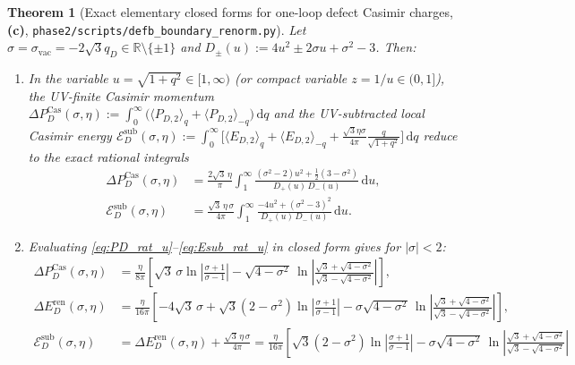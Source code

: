 \documentclass[11pt,a4paper]{article}
\newtheorem{theorem}{Theorem}[section]
\theoremstyle{remark}
\newcommand{\dd}{\mathrm{d}}
\newcommand{\Lc}{\textbf{(c)}}
\newcommand{\sren}{\texttt{phase2/\allowbreak scripts/\allowbreak defb\_\allowbreak boundary\_\allowbreak renorm.py}}
\begin{document}
\begin{theorem}[Exact elementary closed forms for one-loop defect Casimir charges, \Lc, \sren]\label{thm:casimir_closed}
Let $\sigma = \sigma_{\mathrm{vac}} = -2\sqrt{3}q_D \in \mathbb{R}\setminus\{\pm 1\}$
and $D_\pm(u) := 4u^2 \pm 2\sigma u + \sigma^2 - 3$. Then:
\begin{enumerate}
\item In the variable $u = \sqrt{1+q^2} \in [1,\infty)$ (or compact variable
$z = 1/u \in (0,1]$), the UV-finite Casimir momentum
$\Delta P_D^{\mathrm{Cas}}(\sigma,\eta) := \int_0^\infty \big(\langle P_{D,2}\rangle_q + \langle P_{D,2}\rangle_{-q}\big)\,\dd q$
and the UV-subtracted local Casimir energy
$\mathcal{E}_D^{\mathrm{sub}}(\sigma,\eta) := \int_0^\infty \big[\langle E_{D,2}\rangle_q + \langle E_{D,2}\rangle_{-q} + \frac{\sqrt{3}\eta\sigma}{4\pi}\frac{q}{\sqrt{1+q^2}}\big]\,\dd q$
reduce to the exact rational integrals
\begin{align}
  \Delta P_D^{\mathrm{Cas}}(\sigma,\eta)
  &= \frac{2\sqrt{3}\,\eta}{\pi}\int_1^\infty
     \frac{(\sigma^2 - 2)u^2 + \frac{1}{2}(3 - \sigma^2)}{D_+(u)\,D_-(u)}\,\dd u, \label{eq:PD_rat_u}\\
  \mathcal{E}_D^{\mathrm{sub}}(\sigma,\eta)
  &= \frac{\sqrt{3}\,\eta\,\sigma}{4\pi}\int_1^\infty
     \frac{-4u^2 + (\sigma^2 - 3)^2}{D_+(u)\,D_-(u)}\,\dd u. \label{eq:Esub_rat_u}
\end{align}
\item Evaluating \eqref{eq:PD_rat_u}--\eqref{eq:Esub_rat_u} in closed form gives
for $|\sigma| < 2$:
\begin{align}
  \Delta P_D^{\mathrm{Cas}}(\sigma,\eta)
  &= \frac{\eta}{8\pi}\!\left[
     \sqrt{3}\,\sigma\ln\left|\frac{\sigma + 1}{\sigma - 1}\right|
     - \sqrt{4 - \sigma^2}\,\ln\left|\frac{\sqrt{3} + \sqrt{4 - \sigma^2}}{\sqrt{3} - \sqrt{4 - \sigma^2}}\right|
     \right], \label{eq:PD_closed_le2}\\
  \Delta E_D^{\mathrm{ren}}(\sigma,\eta)
  &= \frac{\eta}{16\pi}\!\left[
     -4\sqrt{3}\,\sigma
     + \sqrt{3}(2 - \sigma^2)\ln\left|\frac{\sigma + 1}{\sigma - 1}\right|
     - \sigma\sqrt{4 - \sigma^2}\,\ln\left|\frac{\sqrt{3} + \sqrt{4 - \sigma^2}}{\sqrt{3} - \sqrt{4 - \sigma^2}}\right|
     \right], \label{eq:ED_closed_le2}\\
  \mathcal{E}_D^{\mathrm{sub}}(\sigma,\eta)
  &= \Delta E_D^{\mathrm{ren}}(\sigma,\eta) + \frac{\sqrt{3}\,\eta\,\sigma}{4\pi}
  = \frac{\eta}{16\pi}\!\left[
     \sqrt{3}(2 - \sigma^2)\ln\left|\frac{\sigma + 1}{\sigma - 1}\right|
     - \sigma\sqrt{4 - \sigma^2}\,\ln\left|\frac{\sqrt{3} + \sqrt{4 - \sigma^2}}{\sqrt{3} - \sqrt{4 - \sigma^2}}\right|

\end{align}
\end{enumerate}
\end{theorem}
\end{document}
